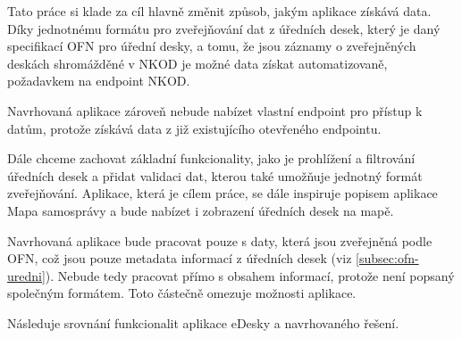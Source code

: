 Tato práce si klade za cíl hlavně změnit způsob, jakým aplikace získává data. Díky jednotnému formátu pro zveřejňování dat z úředních desek, který je daný specifikací OFN pro úřední desky, a tomu, že jsou záznamy o zveřejněných deskách shromážděné v NKOD je možné data získat automatizovaně, požadavkem na endpoint NKOD. 

Navrhovaná aplikace zároveň nebude nabízet vlastní endpoint pro přístup k datům, protože získává data z již existujícího otevřeného endpointu.

Dále chceme zachovat základní funkcionality, jako je prohlížení a filtrování úředních desek a přidat validaci dat, kterou také umožňuje jednotný formát zveřejňování. Aplikace, která je cílem práce, se dále inspiruje popisem aplikace Mapa samosprávy a bude nabízet i zobrazení úředních desek na mapě.

Navrhovaná aplikace bude pracovat pouze s daty, která jsou zveřejněná podle OFN, což jsou pouze metadata informací z úředních desek (viz \autoref{subsec:ofn-uredni}). Nebude tedy pracovat přímo s obsahem informací, protože není popsaný společným formátem. Toto částečně omezuje možnosti aplikace.

Následuje srovnání funkcionalit aplikace eDesky a navrhovaného řešení.

